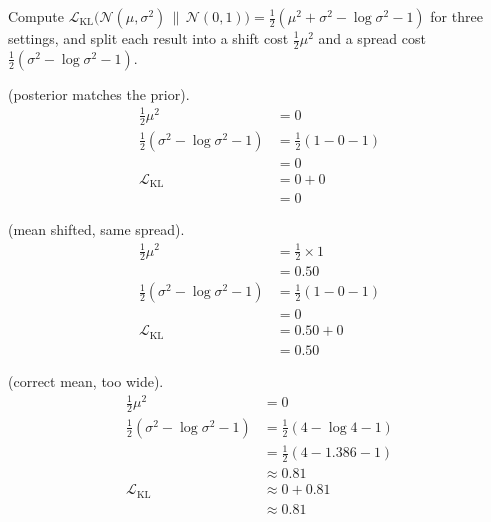 \vspace{2.5em}


Compute $\mathcal{L}_{\text{KL}}\!\bigl(\mathcal{N}(\mu, \sigma^2) \,\|\, \mathcal{N}(0, 1)\bigr) = \tfrac{1}{2}(\mu^2 + \sigma^2 - \log \sigma^2 - 1)$ for three settings, and split each result into a shift cost $\tfrac{1}{2}\mu^2$ and a spread cost $\tfrac{1}{2}(\sigma^2 - \log\sigma^2 - 1)$.

 (posterior matches the prior).
\begin{align*}
    \tfrac{1}{2}\mu^2                          &= 0 \\[4pt]
    \tfrac{1}{2}(\sigma^2 - \log\sigma^2 - 1)  &= \tfrac{1}{2}(1 - 0 - 1) \\
                                                &= 0 \\[4pt]
    \mathcal{L}_{\text{KL}}                    &= 0 + 0 \\
                                                &= 0
\end{align*}

 (mean shifted, same spread).
\begin{align*}
    \tfrac{1}{2}\mu^2                   &= \tfrac{1}{2} \times 1 \\
                                         &= 0.50 \\[4pt]
    \tfrac{1}{2}(\sigma^2 - \log\sigma^2 - 1) &= \tfrac{1}{2}(1 - 0 - 1) \\
                                         &= 0 \\[4pt]
    \mathcal{L}_{\text{KL}}              &= 0.50 + 0 \\
                                         &= 0.50
\end{align*}

 (correct mean, too wide).
\begin{align*}
    \tfrac{1}{2}\mu^2                   &= 0 \\[4pt]
    \tfrac{1}{2}(\sigma^2 - \log\sigma^2 - 1) &= \tfrac{1}{2}(4 - \log 4 - 1) \\
                                         &= \tfrac{1}{2}(4 - 1.386 - 1) \\
                                         &\approx 0.81 \\[4pt]
    \mathcal{L}_{\text{KL}}              &\approx 0 + 0.81 \\
                                         &\approx 0.81
\end{align*}

